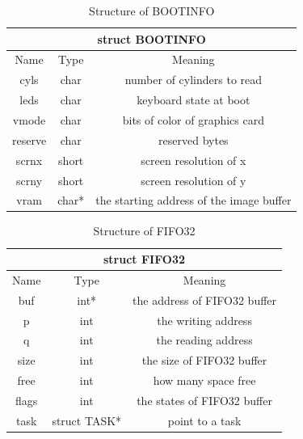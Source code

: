 \documentclass{swfcthesis}
\begin{document}
\begin{table}[h!]
  \centering
  \begin{tabular}[c]{|c|c|c|}
    \hline
    \multicolumn{3}{|c|}{struct BOOTINFO} \\
    \hline
    Name & Type & Meaning \\ \hline
    cyls & char & number of cylinders to read \\
    \hline
    leds & char & keyboard state at boot \\
    \hline
    vmode & char & bits of color of graphics card \\
    \hline
    reserve & char & reserved bytes \\
    \hline
    scrnx & short & screen resolution of x\\
    \hline
    scrny & short & screen resolution of y\\
    \hline
    vram & char* & the starting address of the image buffer \\
    \hline
  \end{tabular}
  \caption{Structure of BOOTINFO}
  \label{tab:BOOTINFO}
\end{table}

\begin{table}[!htbp]
  \centering
  \begin{tabular}[l]{|c|c|c|}
    \hline
    \multicolumn{3}{|c|}{struct FIFO32} \\
    \hline
    Name & Type & Meaning \\ \hline
    buf & int* & the address of FIFO32 buffer\\
    \hline
    p & int & the writing address \\
    \hline
    q & int & the reading address \\
    \hline
    size & int & the size of FIFO32 buffer \\
    \hline
    free & int & how many space free \\
    \hline
    flags & int & the states of FIFO32 buffer \\
    \hline
    task & struct TASK* & point to a task \\
    \hline
  \end{tabular}
  \caption{Structure of FIFO32}
  \label{tab:FIFO32}
\end{table}
\end{document}
